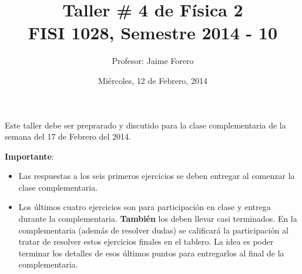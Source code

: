 \documentclass{article}
\title{Taller \# 4 de F\'isica 2\\ FISI 1028, Semestre 2014 - 10}
\author{Profesor: Jaime Forero}
\date{Mi\'ercoles, 12 de Febrero, 2014}
\begin{document}
\maketitle
\thispagestyle{empty}

\noindent
Este taller debe ser preprarado y discutido para la clase
complementaria de la semana del 17 de Febrero del 2014. 

\noindent
{\bf Importante}:
\begin{itemize}

\item
Las respuestas a los seis primeros ejercicios se deben entregar al comenzar la
clase complementaria. 
\item 
Los \'ultimos cuatro ejercicios son para participaci\'on en clase y entrega
durante la complementaria. {\bf{Tambi\'en}} los deben llevar casi
terminados. En la complementaria (adem\'as de resolver dudas) se
calificar\'a la participaci\'on al tratar de resolver estos ejercicios
finales en el tablero. La idea es poder terminar los  detalles de esos
\'ultimos puntos para entregarlos al final de la complementaria.
\end{itemize}
\end{document}
